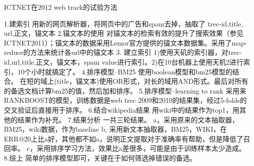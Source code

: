 \documentclass{article}
\begin{document}
\begin{CJK}{UTF8}{gkai}

ICTNET在2012 web track的试验方法

1.建索引
用新的网页解析器，将网页中的广告和spam去掉，抽取了 trec-id,title, url,正文，锚文本
2.锚文本的使用
对锚文本的检索有效的提升了搜索效果（参见ICTNET2011）；锚文本的数据采用Lemor官方提供的锚文本数据集。采用了map-reduce的方法来统计各url中的锚文本
3. 建立索引
1)使用天矶的索引器，对trec-id,url,title,正文，锚文本，spam value进行索引。2)在10台机器上使用天机2进行索引，10个小时就搞定了。
4.排序模型--BM25
使用boolean模型和bm25模型的结合。
在短的域上(title，锚文本)使用OR形式，对长的域用AND形式。最后对所有的备选文档计算bm25的值，然后加和排序。
5.排序模型--learning to rank
采用来RANKBOOST的模型，训练数据是web trec 2009和2010的结果集，经过5-folds的交叉验证后直接用于排序。
6.结合wikipedia结果
用wiki中的结果作为top1，用其他的结果作为补充。
7.结果分析
一共三轮结果。
a，采用原来的文本抽取器，BM25，wiki数据，作为baseline
b, 采用新文本抽取器，BM25，WIKI，在ERR@20上比a好，其他都不如a，说明正文提取对于准确率有帮助，但是降低了召回率。
c，采用排序学习方法，效果比a差很多，可能是由于训练样本太少造成。
8.综上
简单的排序模型即可，关键在于如何筛选掉错误的备选。
\end{CJK}
\end{document}
